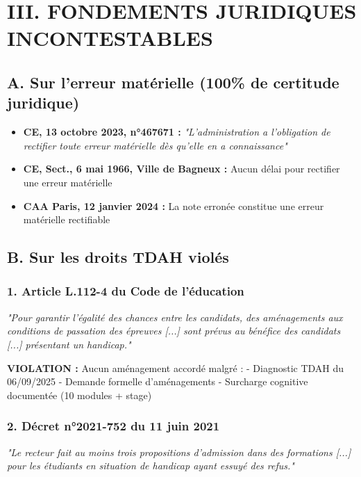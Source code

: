 \documentclass[12pt,french]{scrlttr2}
\begin{document}
\begin{letter}
\section*{III. FONDEMENTS JURIDIQUES INCONTESTABLES}

\subsection*{A. Sur l'erreur matérielle (100\% de certitude juridique)}

\begin{itemize}[leftmargin=*]
\item \textbf{CE, 13 octobre 2023, n°467671 :} \textit{"L'administration a l'obligation de rectifier toute erreur matérielle dès qu'elle en a connaissance"}
\item \textbf{CE, Sect., 6 mai 1966, Ville de Bagneux :} Aucun délai pour rectifier une erreur matérielle
\item \textbf{CAA Paris, 12 janvier 2024 :} La note erronée constitue une erreur matérielle rectifiable
\end{itemize}

\subsection*{B. Sur les droits TDAH violés}

\subsubsection*{1. Article L.112-4 du Code de l'éducation}
\colorbox{blue!10}{\parbox{0.95\textwidth}{
\textit{"Pour garantir l'égalité des chances entre les candidats, des aménagements aux conditions de passation des épreuves [...] sont prévus au bénéfice des candidats [...] présentant un handicap."}
}}

\textbf{VIOLATION :} Aucun aménagement accordé malgré :
- Diagnostic TDAH du 06/09/2025
- Demande formelle d'aménagements
- Surcharge cognitive documentée (10 modules + stage)

\subsubsection*{2. Décret n°2021-752 du 11 juin 2021}
\colorbox{blue!10}{\parbox{0.95\textwidth}{
\textit{"Le recteur fait au moins trois propositions d'admission dans des formations [...] pour les étudiants en situation de handicap ayant essuyé des refus."}
}}


\end{letter}
\end{document}
